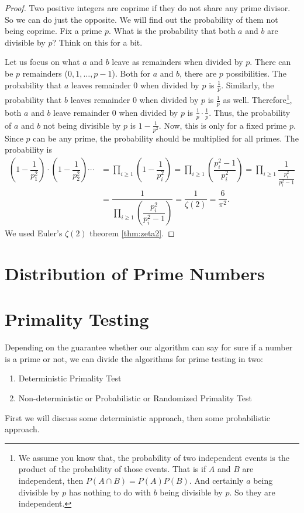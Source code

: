 \documentclass{subfiles}
\begin{document}
	\begin{proof}
		Two positive integers are coprime if they do not share any prime divisor. So we can do just the opposite. We will find out the probability of them not being coprime. Fix a prime $p$. What is the probability that both $a$ and $b$ are divisible by $p$? Think on this for a bit.
		
		Let us focus on what $a$ and $b$ leave as remainders when divided by $p$. There can be $p$ remainders ($0,1,\ldots,p-1$). Both for $a$ and $b$, there are $p$ possibilities. The probability that $a$ leaves remainder $0$ when divided by $p$ is $\frac{1}{p}$. Similarly, the probability that $b$ leaves remainder $0$ when divided by $p$ is $\frac{1}{p}$ as well. Therefore\footnote{We assume you know that, the probability of two independent events is the product of the probability of those events. That is if $A$ and $B$ are independent, then $P(A\cap B)=P(A)P(B)$. And certainly $a$ being divisible by $p$ has nothing to do with $b$ being divisible by $p$. So they are independent.}, both $a$ and $b$ leave remainder $0$ when divided by $p$ is $\frac{1}{p}\cdot\frac{1}{p}$. Thus, the probability of $a$ and $b$ not being divisible by $p$ is $1-\frac{1}{p^2}$. Now, this is only for a fixed prime $p$. Since $p$ can be any prime, the probability should be multiplied for all primes. The probability is
			\begin{align*}
				\left(1-\dfrac{1}{p_1^2}\right)\cdot\left(1-\dfrac{1}{p_2^2}\right)\cdots
				& = \prod_{i\geq1}\left(1-\dfrac{1}{p_i^2}\right) = \prod_{i\geq1}\left(\dfrac{p_i^2-1}{p_i^2}\right) = \prod_{i\geq1}\dfrac{1}{\frac{p_i^2}{p_i^2-1}}\\
				& = \dfrac{1}{\prod_{i\geq1}\left(\dfrac{p_i^2}{p_i^2-1}\right)}  = \dfrac{1}{\zeta(2)} = \dfrac{6}{\pi^2}.
			\end{align*}
		We used Euler's $\zeta(2)$ theorem \eqref{thm:zeta2}.
	\end{proof}

\section{Distribution of Prime Numbers}
	


\section{Primality Testing}\label{sec:primalitytesting}
	Depending on the guarantee whether our algorithm can say for sure if a number is a prime or not, we can divide the algorithms for prime testing in two:
		\begin{enumerate}
			\item Deterministic Primality Test
			\item Non-deterministic or Probabilistic or Randomized Primality Test 
		\end{enumerate}
	First we will discuss some deterministic approach, then some probabilistic approach.
	
\end{document}
